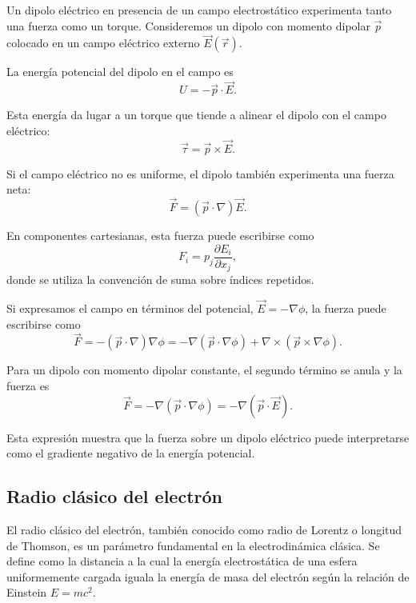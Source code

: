 \documentclass[12pt,a4paper]{book}
\begin{document}
Un dipolo eléctrico en presencia de un campo electrostático experimenta tanto una fuerza como un torque. Consideremos un dipolo con momento dipolar $\vec{p}$ colocado en un campo eléctrico externo $\vec{E}(\vec{r})$.

La energía potencial del dipolo en el campo es
\begin{equation}
U = -\vec{p} \cdot \vec{E}.
\end{equation}

Esta energía da lugar a un torque que tiende a alinear el dipolo con el campo eléctrico:
\begin{equation}
\vec{\tau} = \vec{p} \times \vec{E}.
\end{equation}

Si el campo eléctrico no es uniforme, el dipolo también experimenta una fuerza neta:
\begin{equation}
\vec{F} = (\vec{p} \cdot \nabla)\vec{E}.
\end{equation}

En componentes cartesianas, esta fuerza puede escribirse como
\begin{equation}
F_i = p_j \frac{\partial E_i}{\partial x_j},
\end{equation}
donde se utiliza la convención de suma sobre índices repetidos.

Si expresamos el campo en términos del potencial, $\vec{E} = -\nabla \phi$, la fuerza puede escribirse como
\begin{equation}
\vec{F} = -(\vec{p} \cdot \nabla)\nabla \phi = -\nabla(\vec{p} \cdot \nabla \phi) + \nabla \times (\vec{p} \times \nabla \phi).
\end{equation}

Para un dipolo con momento dipolar constante, el segundo término se anula y la fuerza es
\begin{equation}
\vec{F} = -\nabla(\vec{p} \cdot \nabla \phi) = -\nabla(\vec{p} \cdot \vec{E}).
\end{equation}

Esta expresión muestra que la fuerza sobre un dipolo eléctrico puede interpretarse como el gradiente negativo de la energía potencial.

\subsection{Radio clásico del electrón}

El radio clásico del electrón, también conocido como radio de Lorentz o longitud de Thomson, es un parámetro fundamental en la electrodinámica clásica. Se define como la distancia a la cual la energía electrostática de una esfera uniformemente cargada iguala la energía de masa del electrón según la relación de Einstein $E = mc^2$.
\end{document}
